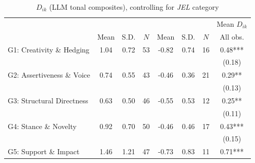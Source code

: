 \begin{table}[H]
    \footnotesize
    \centering
    \begin{threeparttable}
        \caption{\(D_{ik}\) (LLM tonal composites), controlling for \textit{JEL} category}
        \label{table8llm_jel}
        \begin{tabular}{p{3cm}S[table-format=3.3]@{}S[table-format=3.3]@{}S[table-format=3.2]@{}S[table-format=4.3]@{}S[table-format=3.3]@{}S[table-format=3.1]@{}S@{}}
            \toprule
            &&&{{Mean \(D_{ik}\)}}\\\cmidrule(lr){2-4}\cmidrule(lr){5-7}\cmidrule(lr){8-8}&{{Mean}}&{{S.D.}}&{{\(N\)}}&{{Mean}}&{{S.D.}}&{{\(N\)}}&{{All obs.}}\\
            \midrule
            G1: Creativity \& Hedging     &        1.04&        0.72&          53&       -0.82&        0.74&          16&        0.48***\\
                                          &            &            &            &            &            &            &      (0.18)   \\
            G2: Assertiveness \& Voice    &        0.74&        0.55&          43&       -0.46&        0.36&          21&        0.29** \\
                                          &            &            &            &            &            &            &      (0.13)   \\
            G3: Structural Directness     &        0.63&        0.50&          46&       -0.55&        0.53&          12&        0.25** \\
                                          &            &            &            &            &            &            &      (0.11)   \\
            G4: Stance \& Novelty         &        0.92&        0.70&          50&       -0.46&        0.46&          17&        0.43***\\
                                          &            &            &            &            &            &            &      (0.15)   \\
            G5: Support \& Impact         &        1.46&        1.21&          47&       -0.73&        0.83&          11&        0.71***\\

\end{tabular}
\end{threeparttable}
\end{table}
